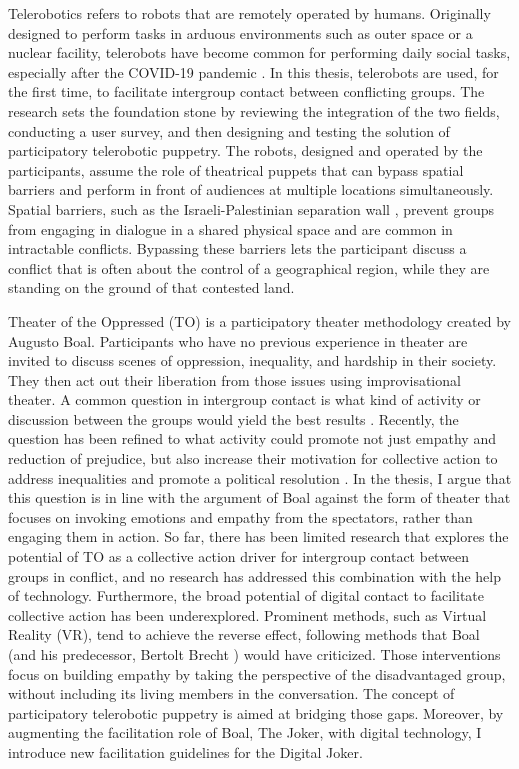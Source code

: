 \documentclass[dissertation,math,vertlayout,pdfa,colorlinks,nologo]{aaltoseries}
\begin{document}
Telerobotics \cite{sheridanTeleoperationTeleroboticsTelepresence1995} refers to robots that are remotely operated by humans. Originally designed to perform tasks in arduous environments such as outer space or a nuclear facility, telerobots have become common for performing daily social tasks, especially after the COVID-19 pandemic \cite{shenRobotsCOVID19Pandemic2021}. In this thesis, telerobots are used, for the first time, to facilitate intergroup contact between conflicting groups. The research sets the foundation stone by reviewing the integration of the two fields, conducting a user survey, and then designing and testing the solution of participatory telerobotic puppetry. The robots, designed and operated by the participants, assume the role of theatrical puppets that can bypass spatial barriers and perform in front of audiences at multiple locations simultaneously. Spatial barriers, such as the Israeli-Palestinian separation wall \cite{weizmanHollowLandIsraels2012}, prevent groups from engaging in dialogue in a shared physical space and are common in intractable conflicts. Bypassing these barriers lets the participant discuss a conflict that is often about the control of a geographical region, while they are standing on the ground of that contested land.

Theater of the Oppressed (TO) \cite{boalTheatreOppressed2008} is a participatory theater methodology created by Augusto Boal. Participants who have no previous experience in theater are invited to discuss scenes of oppression, inequality, and hardship in their society. They then act out their liberation from those issues using improvisational theater. A common question in intergroup contact is what kind of activity or discussion between the groups would yield the best results \cite{maozDoesContactWork2011}. Recently, the question has been refined to what activity could promote not just empathy and reduction of prejudice, but also increase their motivation for collective action to address inequalities and promote a political resolution \cite{coccoMobilizingSedativeEffects2024}. In the thesis, I argue that this question is in line with the argument of Boal against the form of theater that focuses on invoking emotions and empathy from the spectators, rather than engaging them in action. So far, there has been limited research that explores the potential of TO as a collective action driver for intergroup contact between groups in conflict, and no research has addressed this combination with the help of technology. Furthermore, the broad potential of digital contact to facilitate collective action has been underexplored. Prominent methods, such as Virtual Reality (VR), tend to achieve the reverse effect, following methods that Boal (and his predecessor, Bertolt Brecht \cite{boalTheatreOppressed2008}) would have criticized. Those interventions focus on building empathy by taking the perspective of the disadvantaged group, without including its living members in the conversation. The concept of participatory telerobotic puppetry is aimed at bridging those gaps. Moreover, by augmenting the facilitation role of Boal, The Joker, with digital technology, I introduce new facilitation guidelines for the Digital Joker.
\end{document}
